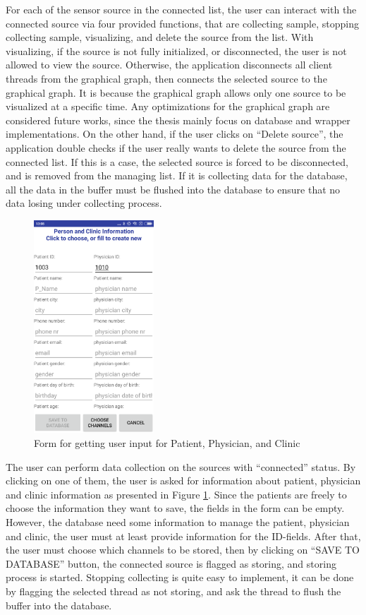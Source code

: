 For each of the sensor source in the connected list, the user can interact with the connected source via four provided functions, that are collecting sample, stopping collecting sample, visualizing, and delete the source from the list. With visualizing, if the source is not fully initialized, or disconnected, the user is not allowed to view the source. Otherwise, the application disconnects all client threads from the graphical graph, then connects the selected source to the graphical graph. It is because the graphical graph allows only one source to be visualized at a specific time. Any optimizations for the graphical graph are considered future works, since the thesis mainly focus on database and wrapper implementations. On the other hand, if the user clicks on “Delete source”, the application double checks if the user really wants to delete the source from the connected list. If this is a case, the selected source is forced to be disconnected, and is removed from the managing list. If it is collecting data for the database, all the data in the buffer must be flushed into the database to ensure that no data losing under collecting process.\\
\begin{figure}
    \centering
    \includegraphics[width=0.4\textwidth]{Figures/clinicpatient.png}
    \caption{Form for getting user input for Patient, Physician, and Clinic}
    \label{fig:Figures/clinicpatient}
\end{figure}
The user can perform data collection on the sources with “connected” status. By clicking on one of them, the user is asked for information about patient, physician and clinic information as presented in Figure \ref{fig:Figures/clinicpatient}. Since the patients are freely to choose the information they want to save, the fields in the form can be empty. However, the database need some information to manage the patient, physician and clinic, the user must at least provide information for the ID-fields. After that, the user must choose which channels to be stored, then by clicking on “SAVE TO DATABASE” button, the connected source is flagged as storing, and storing process is started. Stopping collecting is quite easy to implement, it can be done by flagging the selected thread as not storing, and ask the thread to flush the buffer into the database.\\
